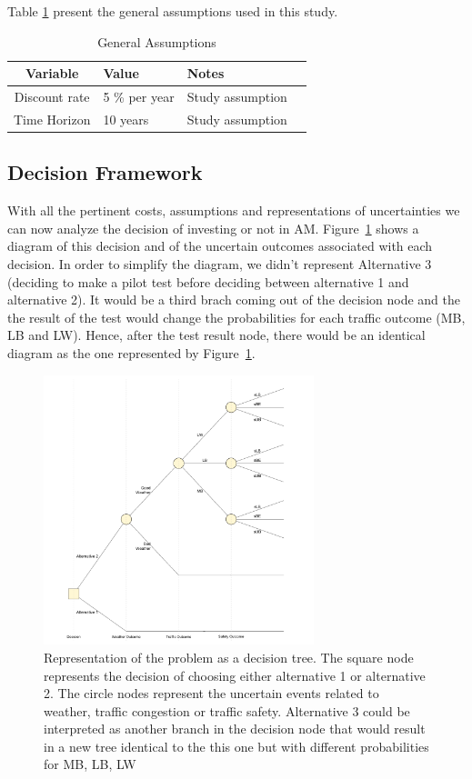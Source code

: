 \documentclass[11pt, letterpaper]{article}
\begin{document}
Table \ref{tab:assumptions} present the general assumptions used in this study.

\begin{table}[h]
\caption{General Assumptions}
\centering
\renewcommand{\arraystretch}{1.1}
\begin{tabular}{c l l l}
\hline
Variable 							& Value 				& Notes 			\\\hline\hline
Discount rate						& 5 \% per year			& Study assumption		\\
Time Horizon						& 10 years			& Study assumption		\\\hline
\end{tabular}
\label{tab:assumptions}
\end{table}%

\subsection{Decision Framework}

With all the pertinent costs, assumptions and representations of uncertainties we can now analyze
the decision of investing or not in AM.  Figure~\ref{decisiontree} shows a diagram of this decision and of the
uncertain outcomes associated with each decision. In order to simplify the diagram, we didn't represent 
Alternative 3 (deciding to make a pilot test before deciding between alternative 1 and alternative 2). It would be a 
third brach coming out of the decision node and the the result of the test would change the probabilities for each 
traffic outcome (MB, LB and LW). Hence, after the test result node, there would be an identical diagram as the one represented
by Figure~\ref{decisiontree}.

\begin{figure}[h]
\centering
\includegraphics[width=0.7\textwidth]{../../R/decisiontree.png}
\caption{Representation of the problem as a decision tree. The square node represents the decision of choosing either alternative 1 or alternative 2. The circle nodes represent the uncertain events related to weather, traffic congestion or traffic safety. Alternative 3 could be interpreted as another branch in the decision node that would result in a new tree identical to the this one but with different probabilities for MB, LB, LW}
\label{decisiontree}
\end{figure}
\end{document}
